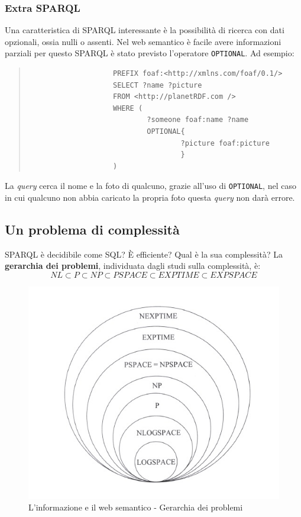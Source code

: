 			\subsubsection{Extra SPARQL}
				Una caratteristica di SPARQL interessante è la possibilità di ricerca con dati opzionali, ossia nulli o assenti. Nel web semantico è facile avere informazioni parziali per questo SPARQL è stato previsto l'operatore \verb|OPTIONAL|. Ad esempio:
				\begin{quote}
				\begin{verbatim}
					PREFIX foaf:<http://xmlns.com/foaf/0.1/>
					SELECT ?name ?picture
					FROM <http://planetRDF.com />
					WHERE (
							?someone foaf:name ?name
							OPTIONAL{
									?picture foaf:picture
									}
					)
				\end{verbatim}
				\end{quote}
				La \emph{query} cerca il nome e la foto di qualcuno, grazie all'uso di \verb|OPTIONAL|, nel caso in cui qualcuno non abbia caricato la propria foto questa \emph{query} non darà errore.
		
		\subsection{Un problema di complessità}
			SPARQL è decidibile come SQL? È efficiente?  Qual è la sua complessità?
			La \textbf{gerarchia dei problemi}, individuata dagli studi sulla complessità, è:
			\[
				NL \subset P \subset NP \subset PSPACE \subset EXPTIME \subset EXPSPACE
			\]
			
			\begin{figure} [h]
				\centering
				\includegraphics[scale=1]{images/LInformazioneEIlWebSemantico-Complessita}
				\caption{L'informazione e il web semantico - Gerarchia dei problemi}
				\label{LInformazioneEIlWebSemantico-Complessita}
			\end{figure}
			
